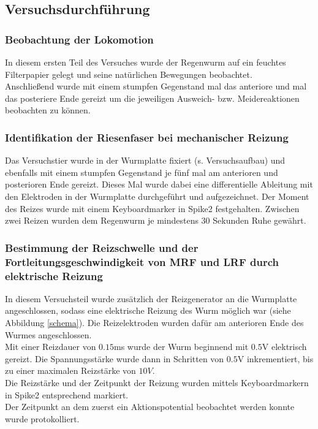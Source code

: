 \documentclass[11pt]{article}
\begin{document}
\subsection{Versuchsdurchführung}

\subsubsection{Beobachtung der Lokomotion}
In diesem ersten Teil des Versuches wurde der Regenwurm auf ein feuchtes Filterpapier gelegt und seine natürlichen Bewegungen beobachtet.\\
Anschließend wurde mit einem stumpfen Gegenstand mal das anteriore und mal das posteriere Ende gereizt um die jeweiligen Ausweich- bzw. Meidereaktionen beobachten zu können. 

\subsubsection{Identifikation der Riesenfaser bei mechanischer Reizung}
Das Versuchstier wurde in der Wurmplatte fixiert (s. Versuchsaufbau) und ebenfalls mit einem stumpfen Gegenstand je fünf mal am anterioren und posterioren Ende gereizt. Dieses Mal wurde dabei eine differentielle Ableitung mit den Elektroden in der Wurmplatte durchgeführt und aufgezeichnet. Der Moment des Reizes wurde mit einem Keyboardmarker in Spike2 festgehalten. Zwischen zwei Reizen wurden dem Regenwurm je mindestens 30 Sekunden Ruhe gewährt.

\subsubsection{Bestimmung der Reizschwelle und der Fortleitungsgeschwindigkeit von MRF und LRF durch elektrische Reizung}\label{durchführung3}
In diesem Versuchsteil wurde zusätzlich der Reizgenerator an die Wurmplatte angeschlossen, sodass eine elektrische Reizung des Wurm möglich war (siehe Abbildung \ref{schema}). Die Reizelektroden wurden dafür am anterioren Ende des Wurmes angeschlossen. \\
Mit einer Reizdauer von $0.15$ms wurde der Wurm beginnend mit $0.5$V elektrisch gereizt.  Die Spannungsstärke wurde dann in Schritten von $0.5$V inkrementiert, bis zu einer maximalen Reizstärke von $10V$. \\
Die Reizstärke und der Zeitpunkt der Reizung wurden mittels Keyboardmarkern in Spike2 entsprechend markiert. \\
Der Zeitpunkt an dem zuerst ein Aktionspotential beobachtet werden konnte wurde protokolliert. \\
\end{document}
